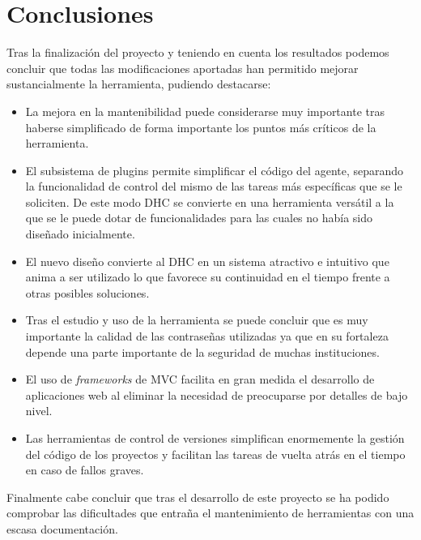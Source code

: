 \chapter{Conclusiones}

Tras la finalización del proyecto y teniendo en cuenta los resultados podemos concluir que todas las modificaciones aportadas han permitido mejorar sustancialmente la herramienta, pudiendo destacarse:

\begin{itemize}
	\item La mejora en la mantenibilidad puede considerarse muy importante tras haberse simplificado de forma importante los puntos más críticos de la herramienta.
	
	\item El subsistema de plugins permite simplificar el código del agente, separando la funcionalidad de control del mismo de las tareas más específicas que se le soliciten. De este modo DHC se convierte en una herramienta versátil a la que se le puede dotar de funcionalidades para las cuales no había sido diseñado inicialmente.
	
	\item El nuevo diseño convierte al DHC en un sistema atractivo e intuitivo que anima a ser utilizado lo que favorece su continuidad en el tiempo frente a otras posibles soluciones.
	
	\item Tras el estudio y uso de la herramienta se puede concluir que es muy importante la calidad de las contraseñas utilizadas ya que en su fortaleza depende una parte importante de la seguridad de muchas instituciones.
	
	\item El uso de \emph{frameworks} de MVC facilita en gran medida el desarrollo de aplicaciones web al eliminar la necesidad de preocuparse por detalles de bajo nivel.
	
	\item Las herramientas de control de versiones simplifican enormemente la gestión del código de los proyectos y facilitan las tareas de vuelta atrás en el tiempo en caso de fallos graves.
\end{itemize}

Finalmente cabe concluir que tras el desarrollo de este proyecto se ha podido comprobar las dificultades que entraña el mantenimiento de herramientas con una escasa documentación.
